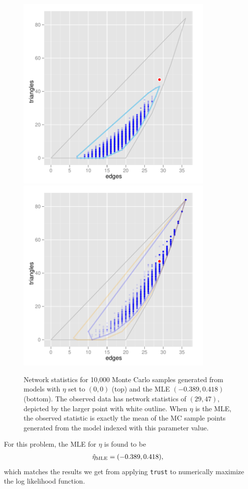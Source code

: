 \begin{figure}[h!]
\centering
\includegraphics[width=3.8in]{Figures/MCsample-far}
\includegraphics[width=3.8in]{Figures/MCsample-MLE}
\caption[Network statistics for 10,000 Monte Carlo samples when MLE exists]
{Network statistics for 10,000 Monte Carlo samples generated from models 
with $\eta$ set to $(0,0)$ (top) and the MLE $(-0.389, 0.418)$ 
(bottom).  The observed data has network statistics of $(29,47)$, depicted by the 
larger point with white outline.  When $\eta$ is the MLE, the observed statistic is 
exactly the mean of the MC sample points generated from the model indexed with this parameter 
value. }
\label{F:MC cloud}
\end{figure}
For this problem, the MLE for $\eta$ is found to be
\begin{align*}
\hat{\eta}_{\textrm{MLE}} = (-0.389, 0.418),
\end{align*}
which matches the results we get from applying \texttt{trust} to numerically
maximize the log likelihood function.

